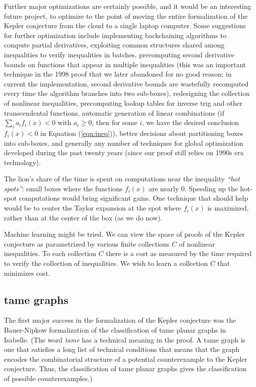 \documentclass{amsart}
\begin{document}
Further major optimizations are certainly possible, and it would be an
interesting future project, to optimize to the point of moving the
entire formalization of the Kepler conjecture from the cloud to a
single laptop computer.  Some suggestions for further optimization
include implementing backchaining algorithms to compute partial
derivatives, exploiting common structures shared among inequalities to
verify inequalities in batches, precomputing second derivative bounds
on functions that appear in multiple inequalities (this was an
important technique in the 1998 proof that we later abandoned for no
good reason; in current the implementation, second derivative bounds
are wastefully recomputed every time the algorithm branches into two
sub-boxes), redesigning the collection of nonlinear inequalities,
precomputing lookup tables for inverse trig and other transcendental
functions, automatic generation of linear combinations (if $\sum_i a_i
f_i(x) < 0$ with $a_i\ge 0$, then for some $i$, we have the desired
conclusion $f_i(x) < 0$ in Equation (\ref{eqn:ineq})), better
decisions about partitioning boxes into sub-boxes, and generally any
number of techniques for global optimization developed during the past
twenty years (since our proof still relies on 1990s era technology).


The lion's share of the time is spent on computations near the
inequality \emph{``hot spots''}: small boxes where the functions
$f_i(x)$ are nearly $0$.  Speeding up the hot-spot computations would
bring significant gains.  One technique that should help would be to
center the Taylor expansion at the spot where $f_i(x)$ is maximized,
rather than at the center of the box (as we do now).

Machine learning might be tried.  We can view the space of proofs of
the Kepler conjecture as parametrized by various finite collections
$C$ of nonlinear inequalities.  To each collection $C$ there is a cost
as measured by the time required to verify the collection of
inequalities.  We wish to learn a collection $C$ that minimizes cost.

\subsection{tame graphs}

The first major success in the formalization of the Kepler conjecture
was the Bauer-Nipkow formalization of the classification of tame
planar graphs in Isabelle.  (The word \emph{tame} has a technical
meaning in the proof.  A tame graph is one that satisfies a long list
of technical conditions that means that the graph encodes the
combinatorial structure of a potential counterexample to the Kepler
conjecture. Thus, the classification of tame planar graphs gives the
classification of possible counterexamples.)
\end{document}

